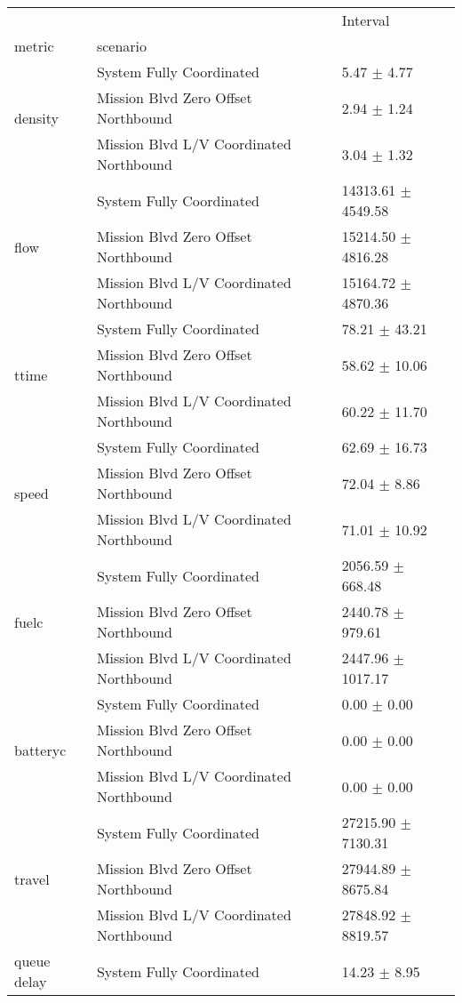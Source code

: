 \begin{tabular}{lll}
\toprule
 &  & Interval \\
metric & scenario &  \\
\midrule
\multirow[t]{3}{*}{density} & System Fully Coordinated & 5.47 $\pm$ 4.77 \\
 & Mission Blvd Zero Offset Northbound & 2.94 $\pm$ 1.24 \\
 & Mission Blvd L/V Coordinated Northbound & 3.04 $\pm$ 1.32 \\
\multirow[t]{3}{*}{flow} & System Fully Coordinated & 14313.61 $\pm$ 4549.58 \\
 & Mission Blvd Zero Offset Northbound & 15214.50 $\pm$ 4816.28 \\
 & Mission Blvd L/V Coordinated Northbound & 15164.72 $\pm$ 4870.36 \\
\multirow[t]{3}{*}{ttime} & System Fully Coordinated & 78.21 $\pm$ 43.21 \\
 & Mission Blvd Zero Offset Northbound & 58.62 $\pm$ 10.06 \\
 & Mission Blvd L/V Coordinated Northbound & 60.22 $\pm$ 11.70 \\
\multirow[t]{3}{*}{speed} & System Fully Coordinated & 62.69 $\pm$ 16.73 \\
 & Mission Blvd Zero Offset Northbound & 72.04 $\pm$ 8.86 \\
 & Mission Blvd L/V Coordinated Northbound & 71.01 $\pm$ 10.92 \\
\multirow[t]{3}{*}{fuelc} & System Fully Coordinated & 2056.59 $\pm$ 668.48 \\
 & Mission Blvd Zero Offset Northbound & 2440.78 $\pm$ 979.61 \\
 & Mission Blvd L/V Coordinated Northbound & 2447.96 $\pm$ 1017.17 \\
\multirow[t]{3}{*}{batteryc} & System Fully Coordinated & 0.00 $\pm$ 0.00 \\
 & Mission Blvd Zero Offset Northbound & 0.00 $\pm$ 0.00 \\
 & Mission Blvd L/V Coordinated Northbound & 0.00 $\pm$ 0.00 \\
\multirow[t]{3}{*}{travel} & System Fully Coordinated & 27215.90 $\pm$ 7130.31 \\
 & Mission Blvd Zero Offset Northbound & 27944.89 $\pm$ 8675.84 \\
 & Mission Blvd L/V Coordinated Northbound & 27848.92 $\pm$ 8819.57 \\
\multirow[t]{3}{*}{queue delay} & System Fully Coordinated & 14.23 $\pm$ 8.95 \\

\end{tabular}

